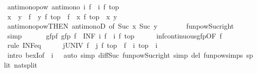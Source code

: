 \begin{isabellebody}
\ antimono{\isacharunderscore}pow{}{\isacharcolon}\ {\isachardoublequoteopen}antimono\ {\isacharparenleft}{\isasymlambda}i{\isachardot}\ {\isacharparenleft}f\ {\isacharcircum}{\isacharcircum}\ i{\isacharparenright}\ {\isacharparenleft}f\ top{\isacharparenright}{\isacharparenright}{\isachardoublequoteclose}\isanewline
\ \ \isamarkupfalse%
\isanewline
\ \ \ \ \isamarkupfalse%
\ {\isachardoublequoteopen}x\ {\isasymle}\ y\ {\isasymLongrightarrow}\ {\isacharparenleft}f\ {\isacharcircum}{\isacharcircum}\ y{\isacharparenright}\ {\isacharparenleft}f\ top{\isacharparenright}\ {\isasymle}\ {\isacharparenleft}f\ {\isacharcircum}{\isacharcircum}\ x{\isacharparenright}\ {\isacharparenleft}f\ top{\isacharparenright}{\isachardoublequoteclose}\ \ x\ y\isanewline
\ \ \ \ \ \ \isamarkupfalse%
\ antimono{\isacharunderscore}pow{\isacharbrackleft}THEN\ antimonoD{\isacharcomma}\ of\ {\isachardoublequoteopen}Suc\ x{\isachardoublequoteclose}\ {\isachardoublequoteopen}Suc\ y{\isachardoublequoteclose}{\isacharbrackright}\isanewline
\ \ \ \ \ \ \isamarkupfalse%
\ funpow{\isacharunderscore}Suc{\isacharunderscore}right\ \isamarkupfalse%
\ simp\isanewline
\ \ \isamarkupfalse%
\isanewline
\isanewline
\ \ \isamarkupfalse%
\ gfp{\isacharunderscore}f{\isacharcolon}\ {\isachardoublequoteopen}gfp\ f\ {\isacharequal}\ {\isacharparenleft}INF\ i{\isachardot}\ {\isacharparenleft}f\ {\isacharcircum}{\isacharcircum}\ i{\isacharparenright}\ {\isacharparenleft}f\ top{\isacharparenright}{\isacharparenright}{\isachardoublequoteclose}\isanewline
\ \ \ \ \isamarkupfalse%
\ inf{\isacharunderscore}continuous{\isacharunderscore}gfp{\isacharbrackleft}OF\ f{\isacharbrackright}\isanewline
\ \ \isamarkupfalse%
\ {\isacharparenleft}rule\ INF{\isacharunderscore}eq{\isacharparenright}\isanewline
\ \ \ \ \isamarkupfalse%
\ {\isachardoublequoteopen}{\isasymexists}j{\isasymin}UNIV{\isachardot}\ {\isacharparenleft}f\ {\isacharcircum}{\isacharcircum}\ j{\isacharparenright}\ {\isacharparenleft}f\ top{\isacharparenright}\ {\isasymle}\ {\isacharparenleft}f\ {\isacharcircum}{\isacharcircum}\ i{\isacharparenright}\ top{\isachardoublequoteclose}\ \ i\isanewline
\ \ \ \ \ \ \isamarkupfalse%
\ {\isacharparenleft}intro\ bexI{\isacharbrackleft}of\ {\isacharunderscore}\ {\isachardoublequoteopen}i\ {\isacharminus}\ {}{\isachardoublequoteclose}{\isacharbrackright}{\isacharparenright}\ {\isacharparenleft}auto\ simp{\isacharcolon}\ diff{\isacharunderscore}Suc\ funpow{\isacharunderscore}Suc{\isacharunderscore}right\ simp\ del{\isacharcolon}\ funpow{\isachardot}simps{\isacharparenleft}{}{\isacharparenright}\ split{\isacharcolon}\ nat{\isachardot}split{\isacharparenright}\isanewline

\end{isabellebody}
